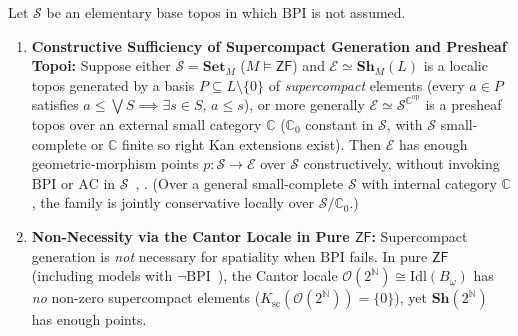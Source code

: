 \begin{theorem}\label{thm:deligne-deformed}%
%

Let $\mathcal{S}$ be an elementary base topos in which $\mathrm{BPI}$ is not assumed.

\begin{enumerate}

  \item \textbf{Constructive Sufficiency of Supercompact Generation and Presheaf Topoi:} Suppose either $\mathcal{S} = \mathbf{Set}_M$ ($M \models \mathsf{ZF}$) and $\mathcal{E} \simeq \mathbf{Sh}_M(L)$ is a localic topos generated by a basis $P \subseteq L \setminus \{0\}$ of \emph{supercompact} elements (every $a \in P$ satisfies $a \le \bigvee S \implies \exists s \in S,\, a \le s$), or more generally $\mathcal{E} \simeq \mathcal{S}^{\mathbb{C}^{\mathrm{op}}}$ is a presheaf topos over an external small category $\mathbb{C}$ ($\mathbb{C}_0$ constant in $\mathcal{S}$, with $\mathcal{S}$ small-complete or $\mathbb{C}$ finite so right Kan extensions exist). Then $\mathcal{E}$ has enough geometric-morphism points $p : \mathcal{S} \to \mathcal{E}$ over $\mathcal{S}$ constructively, without invoking $\mathrm{BPI}$ or $\mathrm{AC}$ in $\mathcal{S}$~\cite[Ch.~II, \S\S 2--4]{Johnstone82}, \cite[\S D3.3]{Johnstone02}. (Over a general small-complete $\mathcal{S}$ with internal category $\mathbb{C}$, the family is jointly conservative locally over $\mathcal{S}/\mathbb{C}_0$.)

  \item \textbf{Non-Necessity via the Cantor Locale in Pure $\mathsf{ZF}$:} Supercompact generation is \emph{not} necessary for spatiality when $\mathrm{BPI}$ fails. In pure $\mathsf{ZF}$ (including models with $\neg\mathrm{BPI}$~\cite{HalpernLevy71,Jech73}), the Cantor locale $\mathcal{O}(2^{\mathbb{N}}) \cong \mathrm{Idl}(B_\omega)$ has \emph{no} non-zero supercompact elements ($K_{\mathrm{sc}}(\mathcal{O}(2^{\mathbb{N}})) = \{0\}$), yet $\mathbf{Sh}(2^{\mathbb{N}})$ has enough points.

\end{enumerate}

\end{theorem}

